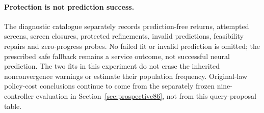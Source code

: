 \paragraph{Protection is not prediction success.}
The diagnostic catalogue separately records prediction-free returns, attempted screens, screen closures, protected refinements, invalid predictions, feasibility repairs and zero-progress probes. No failed fit or invalid prediction is omitted; the prescribed safe fallback remains a service outcome, not successful neural prediction. The two fits in this experiment do not erase the inherited nonconvergence warnings or estimate their population frequency. Original-law policy-cost conclusions continue to come from the separately frozen nine-controller evaluation in Section~\ref{sec:prospective86}, not from this query-proposal table.
